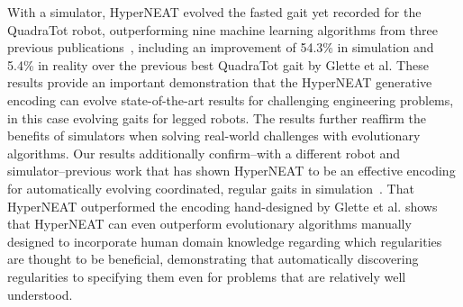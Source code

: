 
With a simulator, HyperNEAT evolved the fasted gait yet recorded for the QuadraTot robot, outperforming nine machine learning algorithms from three previous publications~\cite{yos:clune,glette,haocheng}, including an improvement of 54.3\% in simulation and 5.4\% in reality over the previous best QuadraTot gait by Glette et al. These results provide an important demonstration that the HyperNEAT generative encoding can evolve state-of-the-art results for challenging engineering problems, in this case evolving gaits for legged robots. The results further reaffirm the benefits of simulators when solving real-world challenges with evolutionary algorithms. Our results additionally confirm--with a different robot and simulator--previous work that has shown HyperNEAT to be an effective encoding for automatically evolving coordinated, regular gaits in simulation~\cite{clune2009evolving,clune2011performance,yos:clune}. That HyperNEAT outperformed the encoding hand-designed by Glette et al. shows that HyperNEAT can even outperform evolutionary algorithms manually designed to incorporate human domain knowledge regarding which regularities are thought to be beneficial, demonstrating that automatically discovering regularities to specifying them even for problems that are relatively well understood. 

